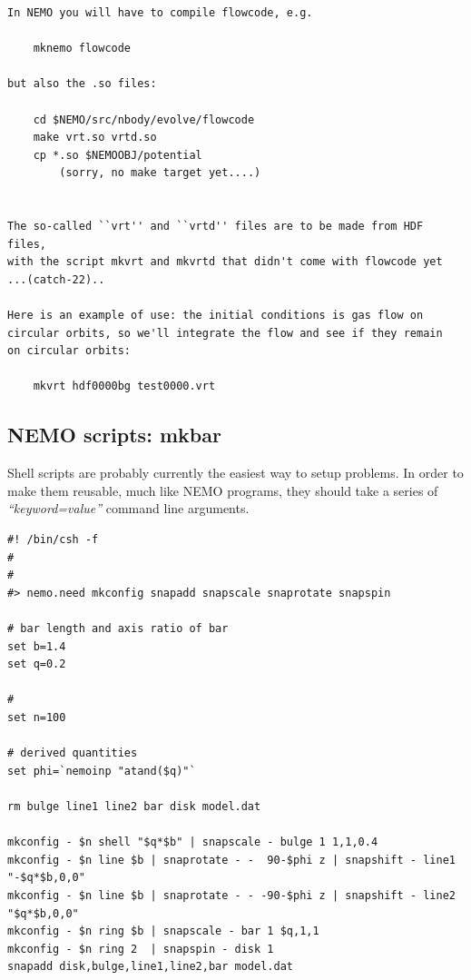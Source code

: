 \documentclass[10pt,dvips]{article}
\begin{document}
\begin{verbatim}
In NEMO you will have to compile flowcode, e.g.

	mknemo flowcode

but also the .so files:

	cd $NEMO/src/nbody/evolve/flowcode
	make vrt.so vrtd.so
	cp *.so $NEMOOBJ/potential
		(sorry, no make target yet....)
	

The so-called ``vrt'' and ``vrtd'' files are to be made from HDF files,
with the script mkvrt and mkvrtd that didn't come with flowcode yet
...(catch-22)..

Here is an example of use: the initial conditions is gas flow on
circular orbits, so we'll integrate the flow and see if they remain
on circular orbits:

	mkvrt hdf0000bg test0000.vrt

\end{verbatim}

\subsection{NEMO scripts: mkbar}

Shell scripts are probably currently the easiest way to setup
problems. In order to make them reusable, much like NEMO
programs, they should take a series of {\it ``keyword=value''}
command line arguments.

\footnotesize\begin{verbatim}
#! /bin/csh -f
#
#
#> nemo.need mkconfig snapadd snapscale snaprotate snapspin

# bar length and axis ratio of bar
set b=1.4
set q=0.2

# 
set n=100

# derived quantities
set phi=`nemoinp "atand($q)"`

rm bulge line1 line2 bar disk model.dat

mkconfig - $n shell "$q*$b" | snapscale - bulge 1 1,1,0.4
mkconfig - $n line $b | snaprotate - -  90-$phi z | snapshift - line1 "-$q*$b,0,0"
mkconfig - $n line $b | snaprotate - - -90-$phi z | snapshift - line2 "$q*$b,0,0"
mkconfig - $n ring $b | snapscale - bar 1 $q,1,1
mkconfig - $n ring 2  | snapspin - disk 1
snapadd disk,bulge,line1,line2,bar model.dat 

\end{verbatim}\normalsize
\end{document}
